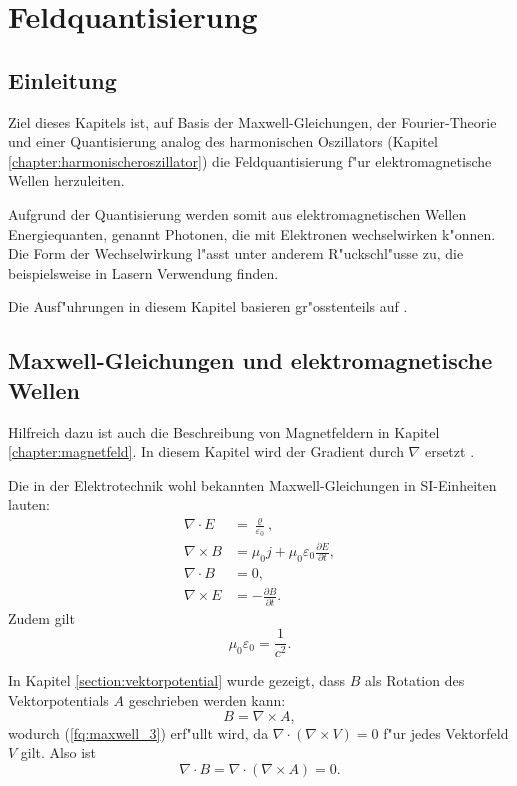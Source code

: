 \chapter{Feldquantisierung\label{chapter:feldquantisierung}}
\begin{refsection}

\section{Einleitung}

Ziel dieses Kapitels ist, auf Basis der Maxwell-Gleichungen, der Fourier-Theorie und einer Quantisierung analog des harmonischen Oszillators (Kapitel \ref{chapter:harmonischeroszillator}) die Feldquantisierung f"ur elektromagnetische Wellen herzuleiten.

Aufgrund der Quantisierung werden somit aus elektromagnetischen Wellen Energiequanten, genannt Photonen, die mit Elektronen wechselwirken k"onnen. Die Form der Wechselwirkung l"asst unter anderem R"uckschl"usse zu, die beispielsweise in Lasern Verwendung finden.

Die Ausf"uhrungen in diesem Kapitel basieren gr"osstenteils auf \cite{fq:aqm}.

\section{Maxwell-Gleichungen und elektromagnetische Wellen}

Hilfreich dazu ist auch die Beschreibung von Magnetfeldern in Kapitel \ref{chapter:magnetfeld}. In diesem Kapitel wird der Gradient durch $\nabla$ ersetzt \cite{fq:nabla}.

Die in der Elektrotechnik wohl bekannten Maxwell-Gleichungen in SI-Einheiten lauten:
\begin{align}
\nabla\cdot E &= \frac{\varrho}{\varepsilon_0} \label{fq:maxwell_1},\\
\nabla\times B &= \mu_0 j  + \mu_0 \varepsilon_0\frac{\partial E}{\partial t} \label{fq:maxwell_2},\\
\nabla\cdot B &=0 \label{fq:maxwell_3},\\
\nabla\times E &= -\frac{\partial B }{\partial t} \label{fq:maxwell_4}.
\end{align}
Zudem gilt
\begin{equation*}
\mu_0\varepsilon_0=\frac{1}{c^2}.
\end{equation*}

In Kapitel \ref{section:vektorpotential} wurde gezeigt, dass $B$ als Rotation des Vektorpotentials $A$ geschrieben werden kann:
\begin{equation}
B = \nabla\times A,
\end{equation}
wodurch (\ref{fq:maxwell_3}) erf"ullt wird, da $\nabla \cdot ( \nabla\times V ) = 0$ f"ur jedes Vektorfeld $V$ gilt. Also ist
\begin{equation*}
\nabla \cdot B = \nabla \cdot ( \nabla\times A ) = 0.
\end{equation*}


\end{refsection}
